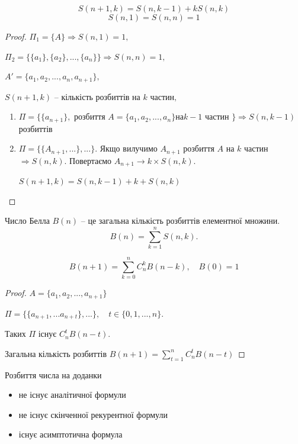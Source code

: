 \begin{theorem}
    $$S(n+1, k) = S(n, k-1) + kS(n, k)$$
    $$S(n, 1) = S(n,n) = 1$$
\end{theorem}
\begin{proof}
    $\Pi_1 = \{A\} \Rightarrow S(n, 1) = 1,$
    
    $\Pi_2 = \{\{a_1\}, \{a_2\}, ..., \{a_n\}\} \Rightarrow S(n, n) = 1,$
    
    $A' = \{a_1, a_2, ..., a_n, a_{n+1}\},$
    
    $S(n+1, k)\text{ -- кількість розбиттів на } k \text{ частин,}$

    \begin{enumerate}
        \item $\Pi = \{\{a_{n + 1}\}, $ розбиття $ A = \{a_1, a_2, ..., a_n\} $на$ k - 1$ частин $\} \Rightarrow S(n, k - 1)$ розбиттів
        \item $\Pi = \{\{A_{n + 1}, ...\}, ...\}$. Якщо вилучимо $A_{n + 1}$ розбиття $A$ на $k$ частин $\Rightarrow S(n, k)$.
        Повертаємо $A_{n + 1} \rightarrow k \times S(n, k)$.

        $S(n + 1, k) = S(n, k - 1) + k + S(n, k)$
    \end{enumerate}
\end{proof}

\begin{definition}
    Число Белла $B(n)$ -- це загальна кількість розбиттів елементної множини.
    \begin{equation*}
        B(n) = \sum\limits_{k = 1}^n S(n, k).
    \end{equation*}
\end{definition}


\begin{theorem}
    $$B(n+1) = \sum\limits_{k=0}^n C_n^k B(n-k), \quad B(0) = 1$$
\end{theorem}
\begin{proof}
    $A = \{a_1, a_2, ..., a_{n + 1}\}$

    $\Pi = \{\{a_{n + 1}, ... a_{n + t}\}, ...\}, \quad t \in \{0, 1, ..., n\}$.

    Таких $\Pi$ існує $C_n^t B(n - t)$.

    Загальна кількість розбиттів
    $B(n + 1) = \sum\limits_{t = 1}^n C_n^t B(n - t)$
\end{proof}

Розбиття числа на доданки
\begin{itemize}
    \item не існує аналітичної формули
    \item не існує скінченної рекурентної формули
    \item існує асимптотична формула
\end{itemize}


